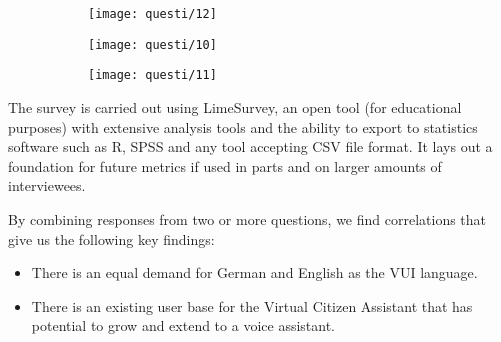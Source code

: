 \begin{figure}[h!]
\begin{center}
%
%
%
%
%
\begin{subfigure}[b]{0.3\linewidth}
	\texttt{[image: questi/12]}
\end{subfigure}
%
%
\begin{subfigure}[b]{0.3\linewidth}
	\texttt{[image: questi/10]}
\end{subfigure}
%
%
%
\begin{subfigure}[b]{0.29\linewidth}
	\texttt{[image: questi/11]}
\end{subfigure}
\end{center}


\end{figure}



\clearpage

The survey is carried out using LimeSurvey, an open tool (for educational purposes) with extensive analysis tools and the ability to export to statistics software such as R, SPSS and any tool accepting CSV file format. It lays out a foundation for future metrics if used in parts and on larger amounts of interviewees.

By combining responses from two or more questions, we find correlations that give us the following key findings: 

\begin{itemize}
	
	\item There is an equal demand for German and English as the VUI language.
	
	\item There is an existing user base for the Virtual Citizen Assistant that has potential to grow and extend to a voice assistant.
\end{itemize}
%


